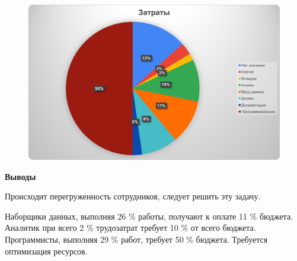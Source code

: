 \begin{figure}[H]
	\begin{center}
		\includegraphics[width=\textwidth]{imgs/task_2_2.png}
	\end{center}
\end{figure}

\textbf{Выводы}

Происходит перегруженность сотрудников, следует решить эту задачу.

Наборщики данных, выполняя 26 \% работы, получают к оплате 11 \% бюджета. Аналитик при всего 2 \% трудозатрат требует 10 \% от всего бюджета. Программисты, выполняя 29 \% работ, требует 50 \% бюджета. Требуется оптимизация ресурсов.